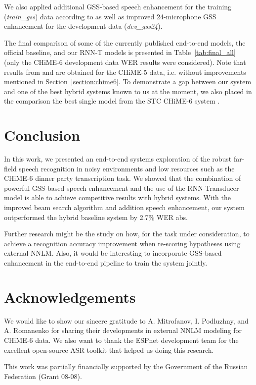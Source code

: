 \documentclass[a4paper]{article}
\begin{document}
We also applied additional GSS-based speech enhancement for the training (\textit{train\_gss}) data according to \cite{Medennikov_chime6} as well as improved 24-microphone GSS enhancement for the development data (\textit{dev\_gss24}).

The final comparison of some of the currently published end-to-end models, the official baseline, and our RNN-T models is presented in Table~\ref{tab:final_all} (only the CHiME-6 development data WER results were considered). Note that results from \cite{chime5_e2e} and \cite{yalta2018cnnbased} are obtained for the CHiME-5 data, i.e. without improvements mentioned in Section~\ref{section:chime6}. To demonstrate a gap between our system and one of the best hybrid systems known to us at the moment, we also placed in the comparison the best single model from the STC CHiME-6 system \cite{Medennikov_chime6}.

\section{Conclusion}
\label{section:conclusion}

In this work, we presented an end-to-end systems exploration of the robust far-field speech recognition in noisy environments and low resources such as the CHiME-6 dinner party transcription task. We showed that the combination of powerful GSS-based speech enhancement and the use of the RNN-Transducer model is able to achieve competitive results with hybrid systems. With the improved beam search algorithm and addition speech enhancement, our system outperformed the hybrid baseline system by 2.7\% WER abs.

Further research might be the study on how, for the task under consideration, to achieve a recognition accuracy improvement when re-scoring hypotheses using external NNLM. Also, it would be interesting to incorporate GSS-based enhancement in the end-to-end pipeline to train the system jointly.

\section{Acknowledgements}
We would like to show our sincere gratitude to A. Mitrofanov, I. Podluzhny, and A. Romanenko for sharing their developments in external NNLM modeling for CHiME-6 data. We also want to thank the ESPnet development team for the excellent open-source ASR toolkit that helped us doing this research.

This work was partially financially supported by the Government of the Russian Federation (Grant 08-08).




\end{document}
